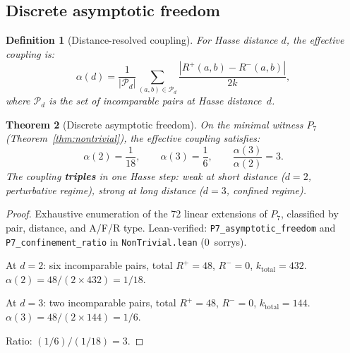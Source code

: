 \documentclass[11pt]{article}
\newtheorem{theorem}{Theorem}[section]
\newtheorem{definition}[theorem]{Definition}
\begin{document}
\subsection{Discrete asymptotic freedom}
\label{sec:asymptotic}

\begin{definition}[Distance-resolved coupling]
\label{def:alpha-d}
For Hasse distance $d$, the \emph{effective coupling} is:
\[
  \alpha(d) = \frac{1}{|\mathcal{P}_d|}
  \sum_{(a,b) \in \mathcal{P}_d}
  \frac{|R^+(a,b) - R^-(a,b)|}{2k},
\]
where $\mathcal{P}_d$ is the set of incomparable pairs at
Hasse distance~$d$.
\end{definition}

\begin{theorem}[Discrete asymptotic freedom]
\label{thm:asymptotic}
On the minimal witness $P_7$
(Theorem~\ref{thm:nontrivial}), the effective coupling
satisfies:
\[
  \alpha(2) = \frac{1}{18}, \qquad
  \alpha(3) = \frac{1}{6}, \qquad
  \frac{\alpha(3)}{\alpha(2)} = 3.
\]
The coupling \textbf{triples} in one Hasse step:
weak at short distance ($d = 2$, perturbative regime),
strong at long distance ($d = 3$, confined regime).
\end{theorem}

\begin{proof}
Exhaustive enumeration of the 72 linear extensions of $P_7$,
classified by pair, distance, and A/F/R type.
Lean-verified: \texttt{P7\_asymptotic\_freedom} and
\texttt{P7\_confinement\_ratio} in \texttt{NonTrivial.lean}
(0~sorrys).

At $d = 2$: six incomparable pairs, total $R^+ = 48$,
$R^- = 0$, $k_{\mathrm{total}} = 432$.
$\alpha(2) = 48/(2 \times 432) = 1/18$.

At $d = 3$: two incomparable pairs, total $R^+ = 48$,
$R^- = 0$, $k_{\mathrm{total}} = 144$.
$\alpha(3) = 48/(2 \times 144) = 1/6$.

Ratio: $(1/6)/(1/18) = 3$.
\end{proof}
\end{document}
